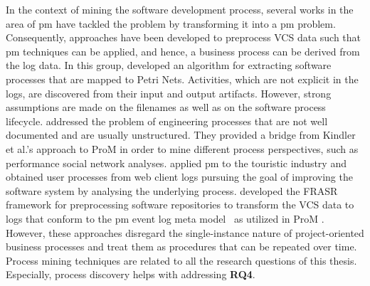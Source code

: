 

In the context of mining the software development process, several works in the area of \gls{pm} have tackled the problem by transforming it into a \gls{pm} problem. 
Consequently, approaches have been developed to preprocess VCS data such that \gls{pm} techniques can be applied, and hence, a business process can be derived from the log data.
In this group, \citep{DBLP:conf/se/KindlerRS06,kindler2006incremental} developed an algorithm for extracting software processes that are mapped to Petri Nets. Activities, which are not explicit in the logs, are discovered from their input and output artifacts. However, strong assumptions are made on the filenames as well as on the software process lifecycle. %
\cite{rubin2007process} addressed the problem of engineering processes that are not well documented and are usually unstructured. They provided a bridge from Kindler et al.'s approach to ProM \citep{van2005prom} in order to mine different process perspectives, such as performance social network analyses. %
\cite{rubin2014agile} applied \gls{pm} to the touristic industry and obtained user processes from web client logs pursuing the goal of improving the software system by analysing the underlying process.
\cite{DBLP:conf/csmr/PoncinSB11} developed the FRASR framework for preprocessing software repositories to transform the VCS data to logs that conform to the \gls{pm} event log meta model~\citep{van2005meta} as utilized in ProM \citep{van2005prom}.
However, these approaches disregard the single-instance nature of project-oriented business processes and treat them as procedures that can be repeated over time.
Process mining techniques are related to all the research questions of this thesis. Especially, process discovery helps with addressing \textbf{RQ4}.


